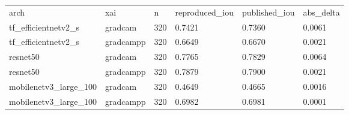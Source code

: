 \begin{tabular}{llllll}
arch & xai & n & reproduced\_iou & published\_iou & abs\_delta \\
tf\_efficientnetv2\_s & gradcam & 320 & 0.7421 & 0.7360 & 0.0061 \\
tf\_efficientnetv2\_s & gradcampp & 320 & 0.6649 & 0.6670 & 0.0021 \\
resnet50 & gradcam & 320 & 0.7765 & 0.7829 & 0.0064 \\
resnet50 & gradcampp & 320 & 0.7879 & 0.7900 & 0.0021 \\
mobilenetv3\_large\_100 & gradcam & 320 & 0.4649 & 0.4665 & 0.0016 \\
mobilenetv3\_large\_100 & gradcampp & 320 & 0.6982 & 0.6981 & 0.0001 \\
\end{tabular}

